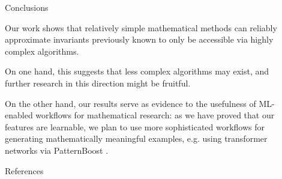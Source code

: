 \documentclass[final,20pt]{beamer}
\newcommand{\todo}[1]{{\color{blue}#1}}
\newlength{\sepwidth}
\newlength{\colwidth}
\newcommand{\separatorcolumn}{\begin{column}{\sepwidth}\end{column}}
\begin{document}
\begin{frame}[t, fragile]
\begin{columns}[t]
\begin{column}{\colwidth}
\begin{block}
    \end{block}

  \begin{exampleblock}{Conclusions}

    Our work shows that relatively simple mathematical methods
    can reliably approximate invariants previously known to only be accessible
    via highly complex algorithms.

    On one hand, this suggests that less complex algorithms
    may exist, and further research in this direction might be fruitful.

    On the other hand, our results serve as evidence
    to the usefulness of ML-enabled workflows for mathematical research:
    as we have proved that our features are learnable,
    we plan to use more sophisticated workflows for generating
    mathematically meaningful examples, e.g. using
    transformer networks via PatternBoost \cite{2411.00566}.
  \end{exampleblock}






  \begin{block}{References}

  {\footnotesize
  \printbibliography
}
  \end{block}

\end{column}

\separatorcolumn
\end{columns}
\end{frame}
\end{document}
